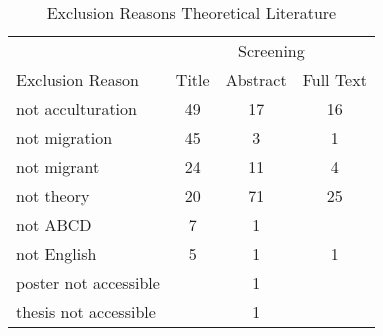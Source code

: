 \begin{table}
\begin{minipage}[t][\textheight][t]{\textwidth}

\caption{\label{tab:}Exclusion Reasons Theoretical Literature}
\begin{tabular}[t]{lccc}
\toprule
\multicolumn{1}{c}{ } & \multicolumn{3}{c}{Screening} \\
\cmidrule(l{3pt}r{3pt}){2-4}
Exclusion Reason & Title & Abstract & Full Text\\
\midrule
not acculturation & 49 & 17 & 16\\
not migration & 45 & 3 & 1\\
not migrant & 24 & 11 & 4\\
not theory & 20 & 71 & 25\\
not ABCD & 7 & 1 & \\
not English & 5 & 1 & 1\\
poster not accessible &  & 1 & \\
thesis not accessible &  & 1 & \\
\bottomrule
\end{tabular}
\end{minipage}
\end{table}
